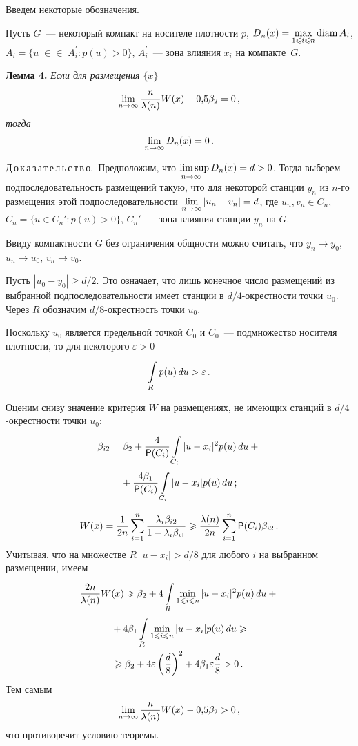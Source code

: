 \begin{multicols}{2}
Введем некоторые обозначения.

Пусть $G$~--- некоторый компакт на носителе плотности $p$,
$D_n(x)=\max\limits_{1\leqslant i\leqslant n}\mathrm{diam}\,A_i$,
$A_i=\{u\;\in$\linebreak $\in\;A_i^{'} : p(u)>0 \}$, $A_i^{'}$~---
зона влияния $x_i$ на компакте~$G$.

\medskip
\noindent
\textbf{Лемма 4.} {\it Если для размещения $\{x\}$
$$
\lim\limits_{n\rightarrow\infty}\displaystyle\frac{\displaystyle n\mathstrut}{\displaystyle \lambda(n)\mathstrut}W(x)-0{,}5\beta_2=0\,,$$ тогда}
$$
\lim\limits_{n\rightarrow\infty} D_n(x)=0\,.
$$

\smallskip
\noindent
Д\,о\,к\,а\,з\,а\,т\,е\,л\,ь\,с\,т\,в\,о.~Предположим, что $\limsup\limits_{n \to \infty~~} D_n(x)=d>0$. Тогда
выберем подпоследовательность размещений такую, что для некоторой станции $y_n$ из $n$-го
размещения этой подпоследовательности $\lim\limits_{n\to\infty} |u_n-v_n|=d$, где $u_n, v_n \in C_n$,
$C_n=\{u\in C_n' : p(u)>0 \}$, $C_n'$~--- зона влияния станции $y_n$ на $G$.

Ввиду компактности $G$ без ограничения общности можно считать, что $y_n \to y_0$,
$u_n \to u_0$, $v_n \to v_0 $.

Пусть $|u_0 - y_0|\geqslant d/2$. Это означает, что лишь конечное число размещений из
выбранной подпоследовательности имеет станции в $d/4$-окрестности точки $u_0$. Через $R$
обозначим $d/8$-окрестность точки $u_0$.

Поскольку $u_0$ является предельной точкой $C_0$ и $C_0$~--- подмножество носителя плотности,
то для некоторого $\varepsilon>0$
$$
\int\limits_{R}^{}p(u)\,du > \varepsilon\,.
$$

Оценим снизу значение критерия $W$ на размещениях, не имеющих станций в $d/4$-окрестности
точки $u_0$:
\begin{multline*}
\beta_{i2}=\beta_2+\displaystyle\frac{\displaystyle 4\mathstrut}{\displaystyle {{\sf P}} (C_i)\mathstrut}\int\limits_{C_i}^{} |u-x_i|^2 p(u)\,du +{}\\
{}+ \displaystyle\frac{\displaystyle 4 \beta_1\mathstrut}{\displaystyle {{\sf P}} (C_i)\mathstrut}\int\limits_{C_i}^{} |u-x_i| p(u)\,du\,;
\end{multline*}

\noindent
$$
W(x)=\displaystyle\frac{\displaystyle 1\mathstrut}{\displaystyle 2n\mathstrut}\sum\limits_{i=1}^{n}\displaystyle\frac{\displaystyle \lambda_i\beta_{i2}\mathstrut}{\displaystyle 1-\lambda_i\beta_{i1}\mathstrut}
\geqslant \displaystyle\frac{\displaystyle \lambda(n)\mathstrut}{\displaystyle 2n\mathstrut}\sum\limits_{i=1}^{n} {{\sf P}} (C_i) \beta_{i2}\,.
$$
Учитывая, что на множестве $R$  $|u-x_i|> d/8$ для любого $i$ на выбранном размещении,
имеем
\begin{multline*}
\displaystyle\frac{\displaystyle 2n\mathstrut}{\displaystyle \lambda(n)\mathstrut}W(x) \geqslant \beta_2 +
4 \int\limits_{R}^{}\min\limits_{1\leqslant i\leqslant
n}|u-x_i|^2 p(u)\,du +{}\\
{}+ 4 \beta_1 \int\limits_{R}^{}\min\limits_{1\leqslant i\leqslant n}|u-x_i| p(u)\,du
\geqslant
\\
\geqslant
 \beta_2+4\varepsilon\left (\displaystyle\frac{\displaystyle d\mathstrut}{\displaystyle 8\mathstrut}\right )^2+4\beta_1\varepsilon\displaystyle\frac{\displaystyle d\mathstrut}{\displaystyle 8\mathstrut} > 0\,.
\end{multline*}
Тем самым
$$
\lim\limits_{n\to\infty}\frac{n}{\lambda(n)}W(x)-0{,}5\beta_2 > 0\,,
$$
что противоречит условию теоремы.


\end{multicols}
